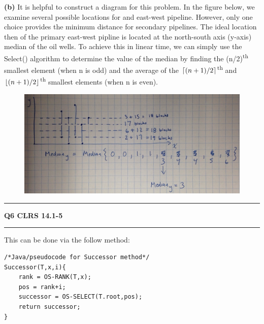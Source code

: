 \documentclass[11pt]{article}
\DeclarePairedDelimiter{\ceil}{\lceil}{\rceil}
\DeclarePairedDelimiter{\floor}{\lfloor}{\rfloor}
\newcommand\question[2]{\vspace{.25in}\hrule\textbf{#1 #2}\vspace{.5em}\hrule\vspace{.10in}}
\renewcommand\part[1]{\vspace{.10in}\textbf{(#1)}}
\begin{document}
\part{b}
It is helpful to construct a diagram for this problem. In the figure below, we examine several possible locations for and east-west pipeline. However, only one choice provides the minimum distance for secondary pipelines. The ideal location then of the primary east-west pipline is located at the north-south axis (y-axis) median of the oil wells. To achieve this in linear time, we can simply use the Select() algorithm to determine the value of the median by finding the (n/2)\textsuperscript{th} smallest element (when n is odd) and the average of the $\ceil{(n+1)/2}$\textsuperscript{th} and $\floor{(n+1)/2}$\textsuperscript{th} smallest elements (when n is even).
\begin{figure}[htbp!]
  \centering
  \includegraphics[width=\textwidth]{IMG_0401.jpg}
\end{figure}

\question{Q6}{   CLRS 14.1-5}
This can be done via the follow method:
\begin{lstlisting}
/*Java/pseudocode for Successor method*/
Successor(T,x,i){
	rank = OS-RANK(T,x);
	pos = rank+i;
	successor = OS-SELECT(T.root,pos);
	return successor;
}	
\end{lstlisting}
\end{document}
